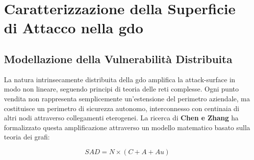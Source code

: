 
\section{\texorpdfstring{Caratterizzazione della Superficie di Attacco nella \gls{gdo}}{2.2 - Caratterizzazione della Superficie di Attacco nella GDO}}

\subsection{\texorpdfstring{Modellazione della Vulnerabilità Distribuita}{2.2.1 - Modellazione della Vulnerabilità Distribuita}}

La natura intrinsecamente distribuita della \gls{gdo} amplifica la \gls{attack-surface} in modo non lineare, seguendo principi di teoria delle reti complesse. Ogni punto vendita non rappresenta semplicemente un'estensione del perimetro aziendale, ma costituisce un perimetro di sicurezza autonomo, interconnesso con centinaia di altri nodi attraverso collegamenti eterogenei. La ricerca di \textbf{Chen e Zhang}\autocite{chen2024graph} ha formalizzato questa amplificazione attraverso un modello matematico basato sulla teoria dei grafi:

\begin{equation}
SAD = N \times (C + A + Au)
\end{equation}

